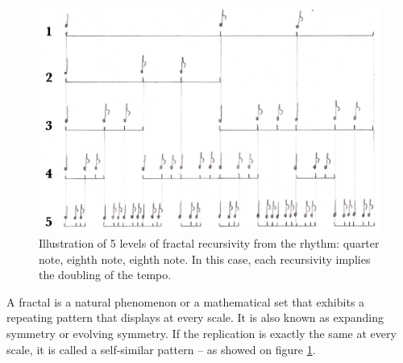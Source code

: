 \begin{figure}[h]
\begin{center}
\includegraphics[scale=0.67]{img/1548}
\caption{Illustration of 5 levels of fractal recursivity from the rhythm: quarter note, eighth note, eighth note. In this case, each recursivity implies the doubling of the tempo.}
\label{fractal}
\end{center}
\end{figure}

{A fractal is a natural phenomenon or a mathematical set that exhibits a repeating pattern that displays at every scale. It is also known as expanding symmetry or evolving symmetry. If the replication is exactly the same at every scale, it is called a self-similar pattern -- as showed on figure \ref{fractal}. 

 }

